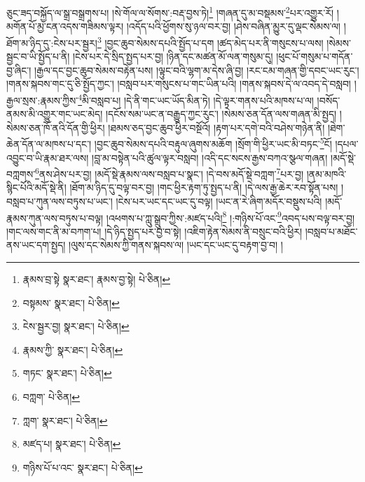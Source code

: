 ཅུང་ཟད་བསྐྱོད་ལ་སྒྲ་བསྒྲགས་པ། །སེ་གོལ་ལ་སོགས་:བརྡ་བྱས་ཏེ།\footnote{རྣམས་བྲ་སྟེ  སྣར་ཐང་། རྣམས་བྱ་སྟེ།  པེ་ཅིན། } །གཞན་དུ་མ་བསྡམས་\footnote{བསྟམས་  སྣར་ཐང་།  པེ་ཅིན། }པར་འགྱུར་རོ། །མགོན་པོ་མྱ་ངན་འདས་གཟིམས་ལྟར། །འདོད་པའི་ཕྱོགས་སུ་ཉལ་བར་བྱ། །ཤེས་བཞིན་མྱུར་དུ་ལྡང་སེམས་ལ། །ཐོག་མ་ཉིད་དུ་:ངེས་པར་སྦྱར།\footnote{ངེས་སྦྱར་བྱ།  སྣར་ཐང་།  པེ་ཅིན། } །བྱང་ཆུབ་སེམས་དཔའི་སྤྱོད་པ་དག །ཚད་མེད་པར་ནི་གསུངས་པ་ལས། །སེམས་སྦྱང་བ་ཡི་སྤྱོད་པ་ནི། །ངེས་པར་དེ་སྲིད་སྤྱད་པར་བྱ། །ཉིན་དང་མཚན་མོ་ལན་གསུམ་དུ། །ཕུང་པོ་གསུམ་པ་གདོན་བྱ་ཞིང་། །རྒྱལ་དང་བྱང་ཆུབ་སེམས་བརྟེན་པས། །ལྟུང་བའི་ལྷག་མ་དེས་ཞི་བྱ། །རང་ངམ་གཞན་གྱི་དབང་ཡང་རུང་། །གནས་སྐབས་གང་དུ་ཅི་སྤྱོད་ཀྱང་། །བསླབ་པར་གསུངས་པ་གང་ཡིན་པའི། །གནས་སྐབས་དེ་ལ་འབད་དེ་བསླབ། །རྒྱལ་སྲས་:རྣམས་ཀྱིས་\footnote{རྣམས་ཀྱི་  སྣར་ཐང་།  པེ་ཅིན། }མི་བསླབ་པ། །དེ་ནི་གང་ཡང་ཡོད་མིན་ཏེ། །དེ་ལྟར་གནས་པའི་མཁས་པ་ལ། །བསོད་ནམས་མི་འགྱུར་གང་ཡང་མེད། །དངོས་སམ་ཡང་ན་བརྒྱུད་ཀྱང་རུང་། །སེམས་ཅན་དོན་ལས་གཞན་མི་སྤྱད། །སེམས་ཅན་ཁོ་ནའི་དོན་གྱི་ཕྱིར། །ཐམས་ཅད་བྱང་ཆུབ་ཕྱིར་བསྔོའོ། །རྟག་པར་དགེ་བའི་བཤེས་གཉེན་ནི། །ཐེག་ཆེན་དོན་ལ་མཁས་པ་དང་། །བྱང་ཆུབ་སེམས་དཔའི་བརྟུལ་ཞུགས་མཆོག །སྲོག་གི་ཕྱིར་ཡང་མི་བཏང་\footnote{གཏང་  སྣར་ཐང་།  པེ་ཅིན། }ངོ། །དཔལ་འབྱུང་བ་ཡི་རྣམ་ཐར་ལས། །བླ་མ་བསྟེན་པའི་ཚུལ་ལྟར་བསླབ། །འདི་དང་སངས་རྒྱས་བཀའ་སྩལ་གཞན། །མདོ་སྡེ་བཀླགས་\footnote{བཀླག་  པེ་ཅིན། }ནས་ཤེས་པར་བྱ། །མདོ་སྡེ་རྣམས་ལས་བསླབ་པ་སྣང་། །དེ་བས་མདོ་སྡེ་བཀླག་\footnote{ཀླག་  སྣར་ཐང་།  པེ་ཅིན། }པར་བྱ། །ནམ་མཁའི་སྙིང་པོའི་མདོ་སྡེ་ནི། །ཐོག་མ་ཉིད་དུ་བལྟ་བར་བྱ། །གང་ཕྱིར་རྟག་ཏུ་སྤྱད་པ་ནི། །དེ་ལས་རྒྱ་ཆེར་རབ་སྟོན་པས། །བསླབ་པ་ཀུན་ལས་བཏུས་པ་ཡང་། །ངེས་པར་ཡང་དང་ཡང་དུ་བལྟ། །ཡང་ན་རེ་ཞིག་མདོར་བསྡུས་པའི། །མདོ་རྣམས་ཀུན་ལས་བཏུས་པ་བལྟ། །འཕགས་པ་ཀླུ་སྒྲུབ་ཀྱིས་:མཛད་པའི།\footnote{མཛད་པ།  སྣར་ཐང་།  པེ་ཅིན། } །:གཉིས་པོ་འང་\footnote{གཉིས་པོ་པ་འང་  སྣར་ཐང་།  པེ་ཅིན། }འབད་པས་བལྟ་བར་བྱ། །གང་ལས་གང་ནི་མ་བཀག་པ། །དེ་ཉིད་སྤྱད་པར་བྱ་བ་སྟེ། །འཇིག་རྟེན་སེམས་ནི་བསྲུང་བའི་ཕྱིར། །བསླབ་པ་མཐོང་ནས་ཡང་དག་སྤྱད། །ལུས་དང་སེམས་ཀྱི་གནས་སྐབས་ལ། །ཡང་དང་ཡང་དུ་བརྟག་བྱ་བ། །
